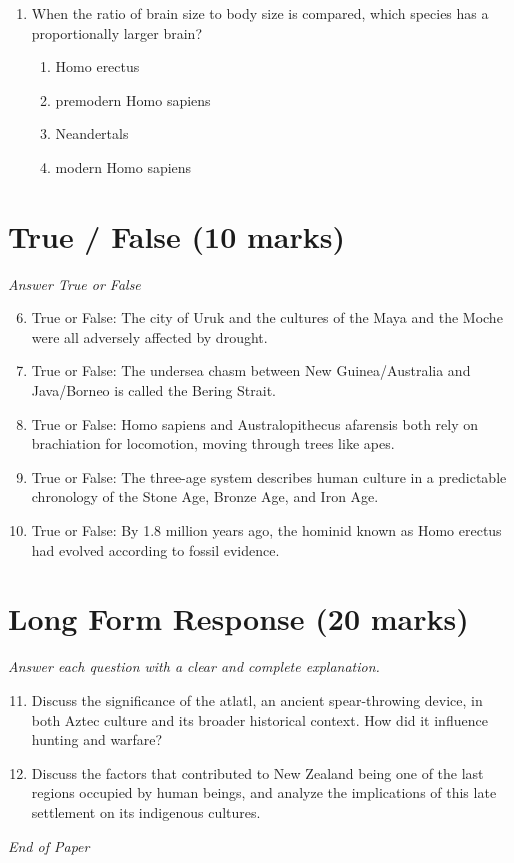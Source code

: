 \documentclass[12pt]{article}
\begin{document}
\begin{enumerate}[label=\arabic*.]
\begin{enumerate}[label=(\alph*)]
    \item sacrificing children in order to propitiate the spirits of the mountains
\end{enumerate}
\item When the ratio of brain size to body size is compared, which species has a proportionally larger brain?
\begin{enumerate}[label=(\alph*)]
    \item Homo erectus
    \item premodern Homo sapiens
    \item Neandertals
    \item modern Homo sapiens
\end{enumerate}
\end{enumerate}

\section*{True / False (10 marks)}
\textit{Answer True or False}
\begin{enumerate}[label=\arabic*.]
\setcounter{enumi}{5}
\item True or False: The city of Uruk and the cultures of the Maya and the Moche were all adversely affected by drought.
\item True or False: The undersea chasm between New Guinea/Australia and Java/Borneo is called the Bering Strait.
\item True or False: Homo sapiens and Australopithecus afarensis both rely on brachiation for locomotion, moving through trees like apes.
\item True or False: The three-age system describes human culture in a predictable chronology of the Stone Age, Bronze Age, and Iron Age.
\item True or False: By 1.8 million years ago, the hominid known as Homo erectus had evolved according to fossil evidence.
\end{enumerate}

\section*{Long Form Response (20 marks)}
\textit{Answer each question with a clear and complete explanation.}
\begin{enumerate}[label=\arabic*.]
\setcounter{enumi}{10}
\item Discuss the significance of the atlatl, an ancient spear-throwing device, in both Aztec culture and its broader historical context. How did it influence hunting and warfare?
\item Discuss the factors that contributed to New Zealand being one of the last regions occupied by human beings, and analyze the implications of this late settlement on its indigenous cultures.
\end{enumerate}

\vfill
\noindent\textit{End of Paper}
\end{document}
